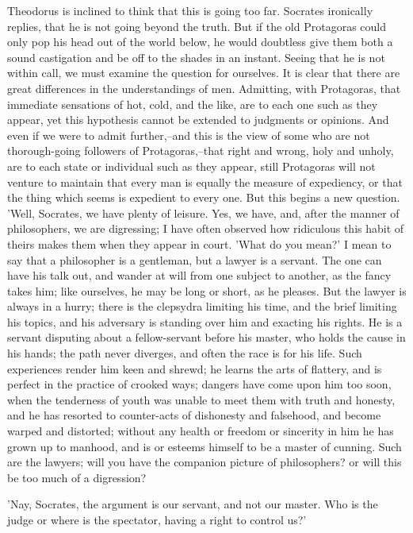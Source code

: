 Theodorus is inclined to think that this is going too far. Socrates
ironically replies, that he is not going beyond the truth. But if the
old Protagoras could only pop his head out of the world below, he would
doubtless give them both a sound castigation and be off to the shades
in an instant. Seeing that he is not within call, we must examine the
question for ourselves. It is clear that there are great differences in
the understandings of men. Admitting, with Protagoras, that immediate
sensations of hot, cold, and the like, are to each one such as they
appear, yet this hypothesis cannot be extended to judgments or opinions.
And even if we were to admit further,--and this is the view of some who
are not thorough-going followers of Protagoras,--that right and wrong,
holy and unholy, are to each state or individual such as they appear,
still Protagoras will not venture to maintain that every man is equally
the measure of expediency, or that the thing which seems is expedient
to every one. But this begins a new question. 'Well, Socrates, we have
plenty of leisure. Yes, we have, and, after the manner of philosophers,
we are digressing; I have often observed how ridiculous this habit of
theirs makes them when they appear in court. 'What do you mean?' I mean
to say that a philosopher is a gentleman, but a lawyer is a servant.
The one can have his talk out, and wander at will from one subject
to another, as the fancy takes him; like ourselves, he may be long or
short, as he pleases. But the lawyer is always in a hurry; there is the
clepsydra limiting his time, and the brief limiting his topics, and his
adversary is standing over him and exacting his rights. He is a servant
disputing about a fellow-servant before his master, who holds the cause
in his hands; the path never diverges, and often the race is for his
life. Such experiences render him keen and shrewd; he learns the arts of
flattery, and is perfect in the practice of crooked ways; dangers have
come upon him too soon, when the tenderness of youth was unable to meet
them with truth and honesty, and he has resorted to counter-acts of
dishonesty and falsehood, and become warped and distorted; without any
health or freedom or sincerity in him he has grown up to manhood, and is
or esteems himself to be a master of cunning. Such are the lawyers; will
you have the companion picture of philosophers? or will this be too much
of a digression?

'Nay, Socrates, the argument is our servant, and not our master. Who is
the judge or where is the spectator, having a right to control us?'

